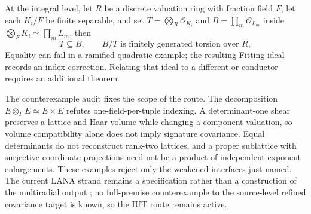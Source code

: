 At the integral level, let $R$ be a discrete valuation ring with fraction
field $F$, let each $K_i/F$ be finite separable, and set
$T=\bigotimes_R\mathcal O_{K_i}$ and
$B=\prod_m\mathcal O_{L_m}$ inside
$\bigotimes_F K_i\simeq\prod_mL_m$, then
\[
                         T\subseteq B,
 \qquad B/T\text{ is finitely generated torsion over }R,
\]
Equality can fail in a ramified quadratic example; the resulting
Fitting ideal records an index correction.  Relating that ideal to a
different or conductor requires an additional theorem.

The counterexample audit fixes the scope of the route.  The decomposition
$E\otimes_FE\simeq E\times E$ refutes one-field-per-tuple indexing.  A
determinant-one shear preserves a lattice and Haar volume while changing a
component valuation, so volume compatibility alone does not imply signature
covariance.  Equal determinants do not reconstruct rank-two lattices, and a
proper sublattice with surjective coordinate projections need not be a
product of independent exponent enlargements.  These examples reject only
the weakened interfaces just named.  The current LANA strand remains a
specification rather than a construction of the multiradial output
\cite{LANA,LANAlean}; no full-premise counterexample to the source-level
refined covariance target is known, so the IUT route remains active.
